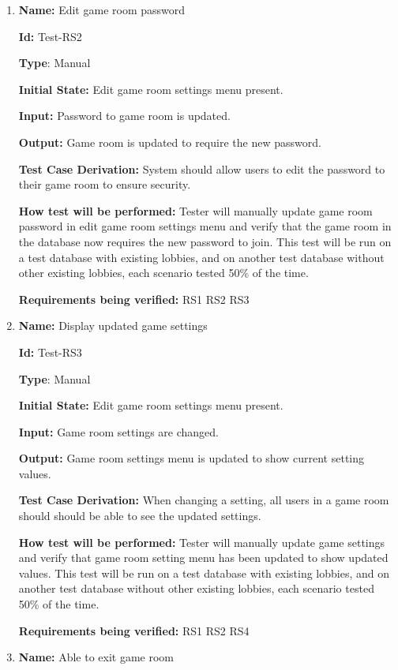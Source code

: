 \documentclass[12pt, titlepage]{article}
\begin{document}
\begin{enumerate}
\item{\textbf{Name:} Edit game room password} \label{itm:Test-RS2}

\textbf{Id:} Test-RS2

\textbf{Type}: Manual

\textbf{Initial State:} Edit game room settings menu present.

\textbf{Input:} Password to game room is updated.

\textbf{Output:} Game room is updated to require the new password.

\textbf{Test Case Derivation:} System should allow users to edit the password to their game room to ensure security.

\textbf{How test will be performed:} Tester will manually update game room password in edit game room settings menu and verify that the game room in the database now requires the new password to join. This test will be run on a test database with existing lobbies, and on another test database without other existing lobbies, each scenario tested 50\% of the time.

\textbf{Requirements being verified: } RS1 RS2 RS3

\item{\textbf{Name:} Display updated game settings} \label{itm:Test-RS3}

\textbf{Id:} Test-RS3

\textbf{Type}: Manual

\textbf{Initial State:} Edit game room settings menu present.

\textbf{Input:} Game room settings are changed.

\textbf{Output:} Game room settings menu is updated to show current setting values.

\textbf{Test Case Derivation:} When changing a setting, all users in a game room should should be able to see the updated settings.

\textbf{How test will be performed:} Tester will manually update game settings and verify that game room setting menu has been updated to show updated values. This test will be run on a test database with existing lobbies, and on another test database without other existing lobbies, each scenario tested 50\% of the time.

\textbf{Requirements being verified: } RS1 RS2 RS4

\item{\textbf{Name:} Able to exit game room} \label{itm:Test-ER1}


\end{enumerate}
\end{document}
